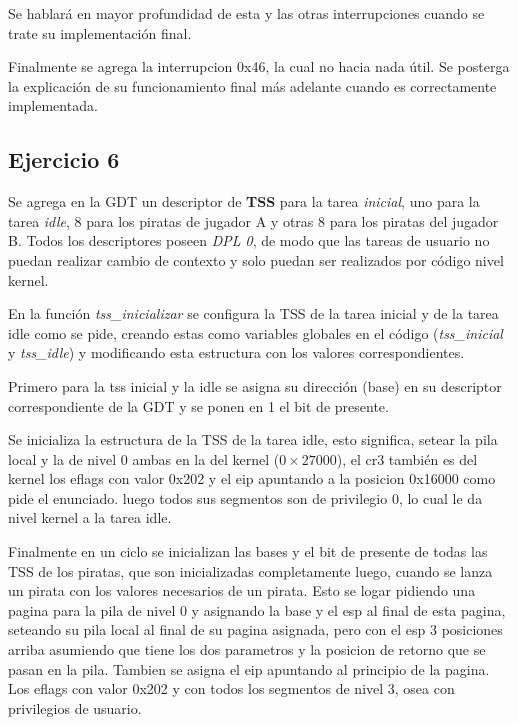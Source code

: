 Se hablará en mayor profundidad de esta y las otras
interrupciones cuando se trate su implementación final.

Finalmente se agrega la interrupcion 0x46, la cual no hacia nada útil. Se
posterga la explicación de su funcionamiento final más adelante cuando es
correctamente implementada.



\subsection{Ejercicio 6}

Se agrega en la GDT un descriptor de {\bf TSS} para la tarea {\it inicial\/},
uno para la tarea {\it idle\/}, 8 para los piratas de jugador A y otras 8 para
los piratas del jugador B. Todos los descriptores poseen {\it DPL 0\/}, de modo
que las tareas de usuario no puedan realizar cambio de contexto y solo puedan
ser realizados por código nivel kernel.

En la función {\it tss_inicializar\/} se configura la TSS de la tarea inicial y
de la tarea idle como se pide, creando estas como variables globales en el
código ({\it tss_inicial} y {\it tss_idle}) y modificando esta estructura con
los valores correspondientes.

Primero para la tss inicial y la idle se asigna su dirección (base) en su
descriptor correspondiente de la GDT y se ponen en 1 el bit de presente.

Se inicializa la estructura de la TSS de la tarea idle, esto significa, setear
la pila local y la de nivel 0 ambas en la del kernel ($0\times27000$), el cr3
también es del kernel
los eflags con valor 0x202 y el eip apuntando a la posicion 0x16000 como pide el enunciado.
luego todos sus segmentos son de privilegio 0, lo cual le da nivel kernel a la tarea idle.

Finalmente en un ciclo se inicializan las bases y el bit de presente de todas las TSS de los piratas, que son inicializadas
completamente luego, cuando se lanza un pirata con los valores necesarios de un pirata.
Esto se logar pidiendo una pagina para la pila de nivel 0 y asignando la base y el esp al final de esta pagina,
seteando su pila local al final de su pagina asignada, pero con el esp 3 posiciones arriba asumiendo que tiene
los dos parametros y la posicion de retorno que se pasan en la pila.
Tambien se asigna el eip apuntando al principio de la pagina. Los eflags con valor 0x202 y con todos los segmentos
de nivel 3, osea con privilegios de usuario.

